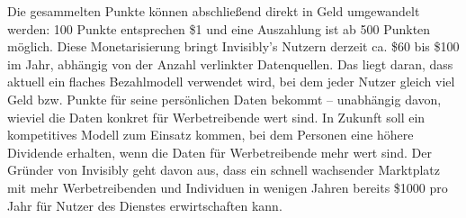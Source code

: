 \noindent Die gesammelten Punkte können abschließend direkt in Geld umgewandelt werden: 100 Punkte entsprechen \$1 und eine Auszahlung ist ab 500 Punkten möglich. \cite{invisiblyWhyPay_2021} Diese Monetarisierung bringt Invisibly's Nutzern derzeit ca. \$60 bis \$100 im Jahr, abhängig von der Anzahl verlinkter Datenquellen. Das liegt daran, dass aktuell ein flaches Bezahlmodell verwendet wird, bei dem jeder Nutzer gleich viel Geld bzw. Punkte für seine persönlichen Daten bekommt -- unabhängig davon, wieviel die Daten konkret für Werbetreibende wert sind. In Zukunft soll ein kompetitives Modell zum Einsatz kommen, bei dem Personen eine höhere Dividende erhalten, wenn die Daten für Werbetreibende mehr wert sind. \cite{pymntsInvisibly_2021} Der Gründer von Invisibly geht davon aus, dass ein schnell wachsender Marktplatz mit mehr Werbetreibenden und Individuen in wenigen Jahren bereits \$1000 pro Jahr für Nutzer des Dienstes erwirtschaften kann. \cite{techRadarInvisibly_2021} 